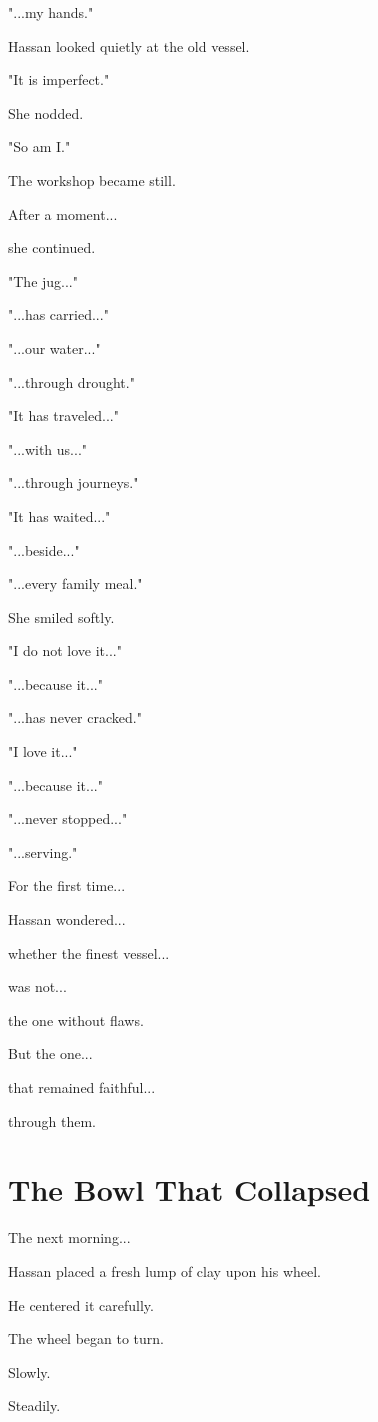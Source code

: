 \documentclass[12pt,openany]{book}
\begin{document}
"...my hands."

Hassan looked quietly at the old vessel.

"It is imperfect."

She nodded.

"So am I."

The workshop became still.

After a moment...

she continued.

"The jug..."

"...has carried..."

"...our water..."

"...through drought."

"It has traveled..."

"...with us..."

"...through journeys."

"It has waited..."

"...beside..."

"...every family meal."

She smiled softly.

"I do not love it..."

"...because it..."

"...has never cracked."

"I love it..."

"...because it..."

"...never stopped..."

"...serving."

For the first time...

Hassan wondered...

whether the finest vessel...

was not...

the one without flaws.

But the one...

that remained faithful...

through them.
\section*{The Bowl That Collapsed}

The next morning...

Hassan placed a fresh lump of clay upon his wheel.

He centered it carefully.

The wheel began to turn.

Slowly.

Steadily.
\end{document}
